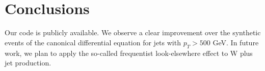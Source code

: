 \section{Conclusions}\label{sec:conclusions}

Our code is publicly available. We observe a clear improvement over the
synthetic events of the canonical differential equation for jets with
$p_T > 500$ GeV. In future work, we plan to apply the so-called
frequentist look-elsewhere effect to W plus jet production.

